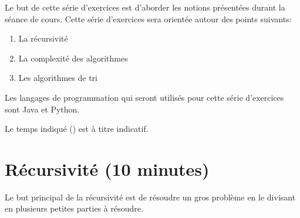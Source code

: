 
\usepackage[T1]{fontenc}
\usepackage{float}




\ShowSolutiontrue
\ShowConseiltrue
\titre
{}

Le but de cette série d'exercices est d'aborder les notions présentées durant la séance de cours. Cette série d'exercices sera orientée autour des points suivants:
\begin{enumerate}
    \item La récursivité
    \item La complexité des algorithmes
    \item Les algorithmes de tri
\end{enumerate}

Les langages de programmation qui seront utilisés pour cette série d'exercices sont Java et Python.

Le temps indiqué (\faClock) est à titre indicatif.

\section{Récursivité (10 minutes)}

Le but principal de la récursivité est de résoudre un gros problème en le divisant en plusieurs petites parties à résoudre. \\

